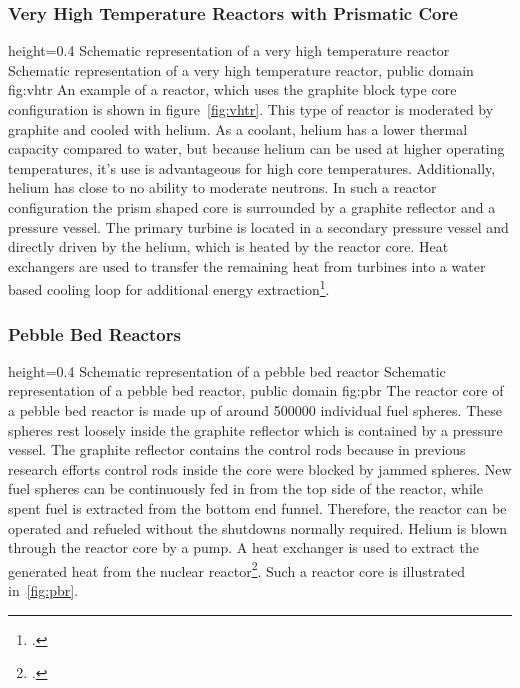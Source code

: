 \subsubsection{Very High Temperature Reactors with Prismatic Core}
    {height=0.4\textheight}
    {Schematic representation of a very high temperature reactor}
    {Schematic representation of a very high temperature reactor, public domain}
    {fig:vhtr}
An example of a reactor, which uses the graphite block type core configuration is shown in figure~\ref{fig:vhtr}.
This type of reactor is moderated by graphite and cooled with helium. As a coolant, helium has
a lower thermal capacity compared to water, but because helium can be used at higher operating
temperatures, it's use is advantageous for high core temperatures. Additionally, helium has close
to no ability to moderate neutrons. In such a reactor configuration
the prism shaped core is surrounded by a graphite reflector and a pressure vessel. The primary turbine
is located in a secondary pressure vessel and directly driven by the helium, which is heated by the
reactor core. Heat exchangers are used to transfer the remaining heat from turbines into a water based
cooling loop for additional energy extraction\footcite{VHTRTS}.
\subsubsection{Pebble Bed Reactors}\label{chap:pbr}
    {height=0.4\textheight}
    {Schematic representation of a pebble bed reactor}
    {Schematic representation of a pebble bed reactor, public domain}
    {fig:pbr}
The reactor core of a pebble bed reactor is made up of around 500000 individual fuel spheres. These
spheres rest loosely inside the graphite reflector which is contained by a pressure vessel. The graphite
reflector contains the control rods because in previous research efforts control rods inside the core were blocked
by jammed spheres. New fuel spheres can be continuously fed in from the top side of the reactor, while
spent fuel is extracted from the bottom end funnel. Therefore, the reactor can be operated and refueled
without the shutdowns normally required. Helium is blown through the reactor core by a
pump. A heat exchanger is used to extract the generated heat from the nuclear reactor\footcite[60-62]{T4Gen}.
Such a reactor core is illustrated in~\ref{fig:pbr}.
